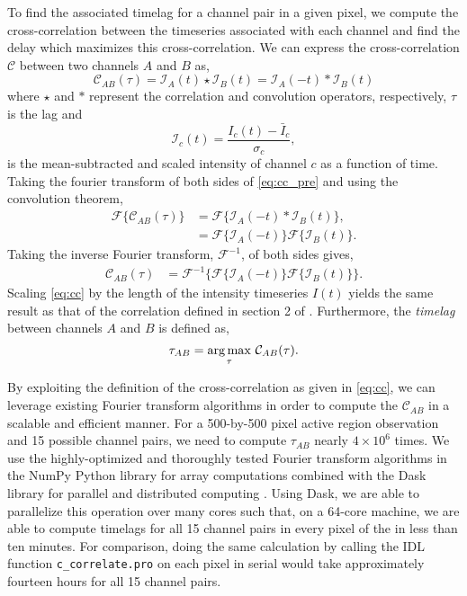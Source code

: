 To find the associated timelag for a channel pair in a given pixel, we compute the cross-correlation between the timeseries associated with each channel and find the delay which maximizes this cross-correlation. We can express the cross-correlation $\mathcal{C}$ between two channels $A$ and $B$ as,
\begin{equation}\label{eq:cc_pre}
    \mathcal{C}_{AB}(\tau) = \mathcal{I}_A(t)\star\mathcal{I}_B(t) = \mathcal{I}_A(-t)\ast\mathcal{I}_B(t)
\end{equation}
where $\star$ and $\ast$ represent the correlation and convolution operators, respectively, $\tau$ is the lag and
\begin{equation*}
    \mathcal{I}_c(t)=\frac{I_c(t)-\bar{I}_c}{\sigma_{c}},
\end{equation*}
is the mean-subtracted and scaled intensity of channel $c$ as a function of time. Taking the fourier transform of both sides of \autoref{eq:cc_pre} and using the convolution theorem,
\begin{align*}
    \mathcal{F}\{\mathcal{C}_{AB}(\tau)\} &= \mathcal{F}\{\mathcal{I}_A(-t)\ast\mathcal{I}_B(t)\},\\
    &= \mathcal{F}\{\mathcal{I}_A(-t)\}\mathcal{F}\{\mathcal{I}_B(t)\}.
\end{align*}
Taking the inverse Fourier transform, $\mathcal{F}^{-1}$, of both sides gives,
\begin{align}\label{eq:cc}
    \mathcal{C}_{AB}(\tau) &= \mathcal{F}^{-1}\{\mathcal{F}\{\mathcal{I}_A(-t)\}\mathcal{F}\{\mathcal{I}_B(t)\}\}.
\end{align}
Scaling \autoref{eq:cc} by the length of the intensity timeseries $I(t)$ yields the same result as that of the correlation defined in section 2 of \citet{viall_evidence_2012}. Furthermore, the \textit{timelag} between channels $A$ and $B$ is defined as,
\begin{equation}\label{eq:timelag}
    \tau_{AB} = \argmax_{\tau}\,\mathcal{C}_{AB}(\tau).
\end{equation}

By exploiting the definition of the cross-correlation as given in \autoref{eq:cc}, we can leverage existing Fourier transform algorithms in order to compute the $\mathcal{C}_{AB}$ in a scalable and efficient manner. For a 500-by-500 pixel active region observation and 15 possible channel pairs, we need to compute $\tau_{AB}$ nearly $4\times10^6$ times. We use the highly-optimized and thoroughly tested Fourier transform algorithms in the NumPy Python library for array computations \citep{oliphant_guide_2006} combined with the Dask library for parallel and distributed computing \citep{dask_development_team_dask_2016}. Using Dask, we are able to parallelize this operation over many cores such that, on a 64-core machine, we are able to compute timelags for all 15 channel pairs in every pixel of the \AR{} in less than ten minutes. For comparison, doing the same calculation by calling the IDL function \texttt{c\_correlate.pro} on each pixel in serial would take approximately fourteen hours for all 15 channel pairs.
